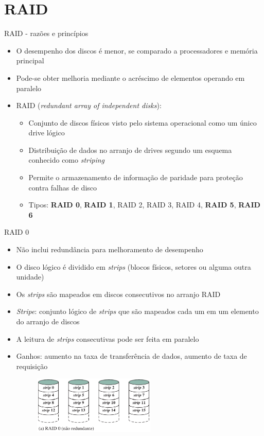 \section[slide=true]{RAID}
\begin{slide}{RAID - razões e princípios}
	\begin{itemize}
		\item O desempenho dos discos é menor, se comparado a processadores e memória principal
		\item Pode-se obter melhoria mediante o acréscimo de elementos operando em paralelo
		\item RAID (\emph{redundant array of independent disks}):
			\begin{itemize}
				\item Conjunto de discos físicos visto pelo sistema operacional como um único drive lógico
				\item Distribuição de dados no arranjo de drives segundo um esquema conhecido como \emph{striping}
				\item Permite o armazenamento de informação de paridade para proteção contra falhas de disco
				\item Tipos: \textbf{RAID 0}, \textbf{RAID 1}, RAID 2, RAID 3, RAID 4, \textbf{RAID 5}, \textbf{RAID 6}
			\end{itemize}
	\end{itemize}
\end{slide}

\begin{slide}{RAID 0}
	\begin{itemize}
		\item Não inclui redundância para melhoramento de desempenho
		\item O disco lógico é dividido em \emph{strips} (blocos físicos, setores ou alguma outra unidade)
		\item Os \emph{strips} são mapeados em discos consecutivos no arranjo RAID
		\item \emph{Stripe}: conjunto lógico de \emph{strips} que são mapeados cada um em um elemento do arranjo de discos
		\item A leitura de \emph{strips} consecutivas pode ser feita em paralelo
		\item Ganhos: aumento na taxa de transferência de dados, aumento de taxa de requisição
			\begin{figure}[h]
				\centering
				\includegraphics[width=0.55\textwidth]{figs/raid0}
			\end{figure}
	\end{itemize}
\end{slide}


